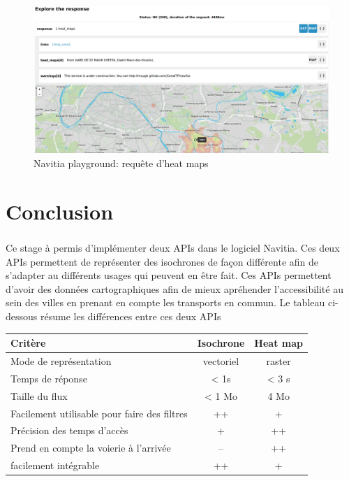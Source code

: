 \documentclass[a4paper]{report}
\begin{document}
\begin{figure}[H]
	\begin{center}
		\includegraphics[width=400pt]{image/n_p_heat_map}
		\caption{Navitia playground: requête d'heat maps}
		\label{Navitia playground: requête d'heat maps}
	\end{center}
\end{figure}

\chapter*{Conclusion}

\paragraph{} Ce stage à permis d'implémenter deux APIs dans le logiciel Navitia. Ces deux APIs permettent de représenter des isochrones de façon différente afin de s'adapter au différents usages qui peuvent en être fait. Ces APIs permettent d'avoir des données cartographiques afin de mieux apréhender l'accessibilité au sein des villes en prenant en compte les transports en commun. Le tableau ci-dessous résume les différences entre ces deux APIs\\

\begin{center}
  \begin{tabular} {|l|c|c|}
  \hline
  Critère & Isochrone & Heat map \\
  \hline
  Mode de représentation & vectoriel & raster \\
  \hline
  Temps de réponse & < 1s &  < 3 s \\
  \hline
  Taille du flux & < 1 Mo & 4 Mo \\
  \hline
  Facilement utilisable pour faire des filtres & ++ & + \\
  \hline
   Précision des temps d'accès & + & ++ \\
  \hline
  Prend en compte la voierie à l'arrivée & -- & ++ \\
  \hline
  facilement intégrable & ++ & + \\
  \hline
  \end{tabular}
\end{center}
\end{document}
